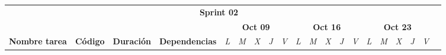\begin{longtable}[c]{llclllllllllllllllll}
        \multicolumn{19}{|c|}{\cellcolor[HTML]{8EA9D8}\textbf{Sprint 02}}                                                                                                                                                                                                                                                                                                                                                                                                                                                                                                                                                                                                                                                                                                                                                                                                                                                              &  \\ \cline{1-19}
        \multicolumn{1}{|c|}{\cellcolor[HTML]{FFFFFF}}                                                                          & \multicolumn{1}{c|}{\cellcolor[HTML]{FFFFFF}}                                  & \multicolumn{1}{c|}{\cellcolor[HTML]{FFFFFF}}                                    & \multicolumn{1}{c|}{\cellcolor[HTML]{FFFFFF}}                                        & \multicolumn{5}{c|}{\textbf{Oct 09}}                                                                                                                                    & \multicolumn{5}{c|}{\textbf{Oct 16}}                                                                                                                                    & \multicolumn{5}{c|}{\textbf{Oct 23}}                                                                                                                                                  &  \\ \cline{5-19}
        \multicolumn{1}{|c|}{\multirow{-2}{*}{\cellcolor[HTML]{FFFFFF}\textbf{Nombre tarea}}}                                   & \multicolumn{1}{c|}{\multirow{-2}{*}{\cellcolor[HTML]{FFFFFF}\textbf{Código}}} & \multicolumn{1}{c|}{\multirow{-2}{*}{\cellcolor[HTML]{FFFFFF}\textbf{Duración}}} & \multicolumn{1}{c|}{\multirow{-2}{*}{\cellcolor[HTML]{FFFFFF}\textbf{Dependencias}}} & \multicolumn{1}{l|}{\textit{L}} & \multicolumn{1}{l|}{\textit{M}} & \multicolumn{1}{l|}{\textit{X}} & \multicolumn{1}{l|}{\textit{J}} & \multicolumn{1}{l|}{\textit{V}} & \multicolumn{1}{l|}{\textit{L}} & \multicolumn{1}{l|}{\textit{M}} & \multicolumn{1}{l|}{\textit{X}} & \multicolumn{1}{l|}{\textit{J}} & \multicolumn{1}{l|}{\textit{V}} & \multicolumn{1}{l|}{\textit{L}} & \multicolumn{1}{l|}{\textit{M}} & \multicolumn{1}{l|}{\textit{X}} & \multicolumn{1}{l|}{\textit{J}} & \multicolumn{1}{l|}{\textit{V}}               &  \\ \cline{1-19}

\end{longtable}
